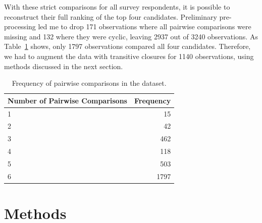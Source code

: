 \documentclass[hidelinks,11pt]{article} \usepackage[utf8]{inputenc}
\begin{document}
With these strict comparisons for all survey respondents, it is possible to
reconstruct their full ranking of the top four candidates. Preliminary
pre-processing led me to drop 171 observations where all pairwise comparisons
were missing and 132 where they were cyclic, leaving 2937 out of 3240
observations. As Table~\ref{Tab:Tcpairwise} shows, only 1797 observations
compared all four candidates. Therefore, we had to augment the data with
transitive closures for 1140 observations, using methods discussed in the next
section.






\begin{table}[!h]\centering
\begin{tabular}{lr}
\hline
Number of Pairwise Comparisons & Frequency \\ \hline
1                              & 15        \\
2                              & 42        \\
3                              & 462       \\
4                              & 118       \\
5                              & 503       \\
6                              & 1797      \\ \hline
\end{tabular}


\caption{Frequency of pairwise comparisons in the dataset.}

\label{Tab:Tcpairwise}
\end{table}


\section{Methods}
\end{document}
